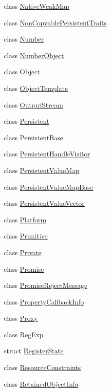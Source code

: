 \begin{DoxyCompactItemize}
\item 
class \hyperlink{classv8_1_1_native_weak_map}{Native\+Weak\+Map}
\item 
class \hyperlink{classv8_1_1_non_copyable_persistent_traits}{Non\+Copyable\+Persistent\+Traits}
\item 
class \hyperlink{classv8_1_1_number}{Number}
\item 
class \hyperlink{classv8_1_1_number_object}{Number\+Object}
\item 
class \hyperlink{classv8_1_1_object}{Object}
\item 
class \hyperlink{classv8_1_1_object_template}{Object\+Template}
\item 
class \hyperlink{classv8_1_1_output_stream}{Output\+Stream}
\item 
class \hyperlink{classv8_1_1_persistent}{Persistent}
\item 
class \hyperlink{classv8_1_1_persistent_base}{Persistent\+Base}
\item 
class \hyperlink{classv8_1_1_persistent_handle_visitor}{Persistent\+Handle\+Visitor}
\item 
class \hyperlink{classv8_1_1_persistent_value_map}{Persistent\+Value\+Map}
\item 
class \hyperlink{classv8_1_1_persistent_value_map_base}{Persistent\+Value\+Map\+Base}
\item 
class \hyperlink{classv8_1_1_persistent_value_vector}{Persistent\+Value\+Vector}
\item 
class \hyperlink{classv8_1_1_platform}{Platform}
\item 
class \hyperlink{classv8_1_1_primitive}{Primitive}
\item 
class \hyperlink{classv8_1_1_private}{Private}
\item 
class \hyperlink{classv8_1_1_promise}{Promise}
\item 
class \hyperlink{classv8_1_1_promise_reject_message}{Promise\+Reject\+Message}
\item 
class \hyperlink{classv8_1_1_property_callback_info}{Property\+Callback\+Info}
\item 
class \hyperlink{classv8_1_1_proxy}{Proxy}
\item 
class \hyperlink{classv8_1_1_reg_exp}{Reg\+Exp}
\item 
struct \hyperlink{structv8_1_1_register_state}{Register\+State}
\item 
class \hyperlink{classv8_1_1_resource_constraints}{Resource\+Constraints}
\item 
class \hyperlink{classv8_1_1_retained_object_info}{Retained\+Object\+Info}

\end{DoxyCompactItemize}
